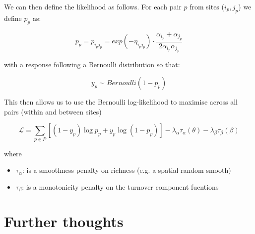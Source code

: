 \documentclass{article}
\begin{document}
We can then define the likelihood as follows. For each pair $p$ from sites ($i_{p},j_{p}$) we define $p_{p}$ as:

\begin{equation}
    p_{p} = p_{i_{p}j_{p}} = exp(-\eta_{i_{p}j_{p}}) \cdot \frac{\alpha_{i_{p}} + \alpha_{j_{p}}}{2\alpha_{i_{p}}\alpha_{j_{p}}}
\end{equation}

with a response following a Bernoulli distribution so that:

\begin{equation}
    y_{p} \sim Bernoulli(1-p_{p})
\end{equation}

This then allows us to use the Bernoulli log-likelihood to maximise across all pairs (within and between sites)

\begin{equation}
    \mathcal{L} = \sum_{p \in P}[(1 - y_{p}) \log p_{p} + y_{p} \log(1-p_{p})] - \lambda_{\alpha} \tau_{\alpha}(\theta) - \lambda_{\beta} \tau_{\beta}(\beta)
\end{equation}

where

\begin{itemize}
    \item $\tau_{\alpha}$: is a smoothness penalty on richness (e.g. a spatial random smooth)
    \item $\tau_{\beta}$: is a monotonicity penalty on the turnover component fucntions
\end{itemize}

\section{Further thoughts}
\end{document}
